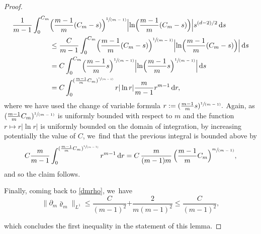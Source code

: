 \documentclass[JEP,XML,SOM,Unicode,published]{cedram}
\newcommand{\spfrac}[2]{\sfrac{#1}{(#2)}}
\newcommand{\prt}[1]{(#1)}
\newcommand{\Bprt}[1]{\Bigl(#1\Bigr)}
\newcommand{\dx}[1]{\mathop{}\!\mathrm{d} #1}
\theoremstyle{plain}
\theoremstyle{remark}
\begin{document}
\begin{proof}
\begin{align*}
\frac{1}{m-1}\int_0^{C_m} & \Bprt{\frac{m-1}{m}(C_m -s)}^{\spfrac{1}{m-1}} \Bigl|\ln \Bprt{\frac{m-1}{m}(C_m -s)} \Bigr| s^{(d-2)/2} \dx s\\
& \le \frac{C}{m-1}\int_0^{C_m} \Bprt{\frac{m-1}{m}(C_m -s)}^{\spfrac{1}{m-1}} \Bigl|\ln \Bprt{\frac{m-1}{m}(C_m -s)} \Bigr| \dx s\\
& = C\int_0^{C_m} \Bprt{\frac{m-1}{m}s}^{\spfrac{1}{m-1}} \Bigl|\ln \Bprt{\frac{m-1}{m}s}^{\spfrac{1}{m-1}} \Bigr| \dx s\\
& = C\int_0^{\prt{\frac{m-1}{m}C_{m}}^{\spfrac{1}{m-1}}} r |\ln r| \frac{m}{m-1} r^{m-1}\dx r,
\end{align*}
where we have used the change of variable formula $r:=\prt{\frac{m-1}{m}s}^{\spfrac{1}{m-1}}.$ Again, as $\prt{\frac{m-1}{m}C_{m}}^{\spfrac{1}{m-1}}$ is uniformly bounded with respect to $m$ and the function $r\mapsto r |\ln r|$ is uniformly bounded on the domain of integration, by increasing potentially the value of $C$, we~find that the previous integral is bounded above by
\begin{align*}
C\frac{m}{m-1} \int_0^{\prt{\frac{m-1}{m}C_{m}}^{\spfrac{1}{m-1}}} r^{m-1}\dx r = C\,\frac{m}{(m-1)m}\, \Bprt{\frac{m-1}{m}C_{m}}^{\spfrac{m}{m-1}},
\end{align*}
and so the claim follows.

Finally, coming back to \eqref{dmrho}, we~have
\begin{equation}\label{rate l1}
\|\partial_m \bar\varrho_m\|_{L^1}\leq \frac{C}{(m-1)^2}{+ \frac{2}{m(m-1)^2} \leq \frac{C}{(m-1)^2}},
\end{equation}
{ which concludes the first inequality in the statement of this lemma.

}
\end{proof}
\end{document}
